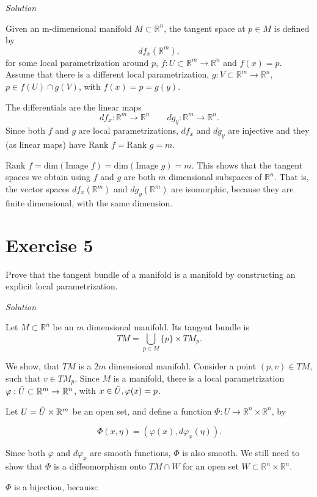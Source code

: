 \documentclass[a4paper,11pt,pdftex]{article}
\begin{document}
\emph{Solution}

Given an m-dimensional manifold $M\subset \mathbb{R}^n$, the tangent space at $p\in M$ is defined by 
$$
df_x(\mathbb{R}^m),
$$
for some local parametrization around $p$, $f:U\subset \mathbb{R}^m \to \mathbb{R}^n$ and $f(x)=p$. Assume that there is a different local parametrization, $g: V\subset \mathbb{R}^m \to \mathbb{R}^n$, $p\in f(U) \cap g(V)$, with  $f(x)=p=g(y)$. 

The differentials are the linear maps
$$
df_x : \mathbb{R}^m \to \mathbb{R}^n \qquad dg_y : \mathbb{R}^m \to \mathbb{R}^n.
$$
Since both $f$ and $g$ are local parametrizations, $df_x$ and $dg_y$ are injective and they (as linear maps) have $\text{Rank } f =\text{Rank } g = m$. 

$\text{Rank } f = \text{dim} (\text{Image }f) = \text{dim} (\text{Image }g) = m$. This shows that the tangent spaces we obtain using $f$ and $g$ are both $m$ dimensional subspaces of $\mathbb{R}^n$. That is, the vector spaces $df_x(\mathbb{R}^m)$ and $dg_y(\mathbb{R}^m)$ are isomorphic, because they are finite dimensional, with the same dimension. 

\section*{Exercise 5}
Prove that the tangent bundle of a manifold is a manifold by constructing an explicit local parametrization.

\emph{Solution}

Let $M\subset \mathbb{R}^n$ be an $m$ dimensional manifold. Its tangent bundle is 
$$
TM = \bigcup_{p\in M} \{p\}\times TM_p. 
$$

We show, that $TM$ is a $2m$ dimensional manifold. Consider a point $(p,v)\in TM$, such that $v\in TM_p$. Since $M$ is a manifold, there is a local parametrization $\varphi:\Tilde{U}\subset \mathbb{R}^m \to \mathbb{R}^n$, with $x\in \Tilde{U}, \varphi(x)=p$.

Let $U = \Tilde{U} \times \mathbb{R}^m$ be an open set, and define a function
$\Phi :U \to \mathbb{R}^n\times \mathbb{R}^n$, by

$$
\Phi(x, \eta) = (\varphi(x), d\varphi_x(\eta)).
$$

Since both $\varphi$ and $d\varphi_x$ are smooth functions, $\Phi$ is also smooth. 
We still need to show that $\Phi$ is a diffeomorphism onto $TM\cap W$ for an open set $W\subset \mathbb{R}^n \times \mathbb{R}^n$.

$\Phi$ is a bijection, because:
\end{document}
